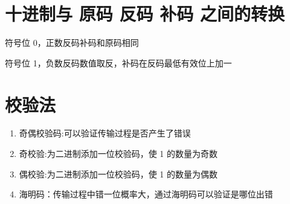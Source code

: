 \newpage

\section{十进制与 原码 反码 补码 之间的转换}

符号位 0，正数反码补码和原码相同

符号位 1，负数反码数值取反，补码在反码最低有效位上加一

\newpage

\section{校验法}

\begin{enumerate}

    \item 奇偶校验码:可以验证传输过程是否产生了错误
    \item 奇校验:为二进制添加一位校验码，使 1 的数量为奇数
    \item 偶校验:为二进制添加一位校验码，使 1 的数量为偶数
    \item 海明码：传输过程中错一位概率大，通过海明码可以验证是哪位出错

\end{enumerate}

\newpage

